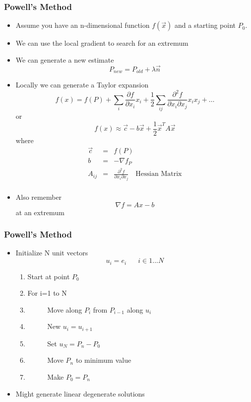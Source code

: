 \documentclass[10pt]{beamer}
\begin{document}
\begin{frame}
  \frametitle{Powell's Method}
  \begin{itemize}
  \item Assume you have an n-dimensional function $f(\vec{x})$ and a starting point $P_0$. 
  \item We can use the local gradient to search for an extremum
  \item We can generate a new estimate
    \[
      P_{new} = P_{old} + \lambda \vec{n}
    \]
  \item Locally we can generate a Taylor expansion
    \[
      f(x) = f(P) + \sum_i \frac{\partial f}{\partial x_i} x_i + \frac{1}{2} \sum_{ij} \frac{\partial^2f}{\partial x_i \partial x_j} x_i x_j + \ldots
    \] or 
    \[
      f(x) \approx \vec{c} - b \vec{x} + \frac{1}{2} \vec{x}^T A \vec{x}
    \] where
    \[
      \begin{array}{ccc}
        \vec{c} &= & f(P)\\
        b & = & - \nabla f_P \\
        A_{ij} & = & \frac{\partial^2 f}{\partial x_i \partial x_j} \mbox{~~ Hessian Matrix} \\
      \end{array}
    \] 
  \item Also remember
    \[ \nabla f = A x - b \]
    at an extremum
  \end{itemize}
\end{frame}

\begin{frame}
  \frametitle{Powell's Method}
  \begin{itemize}
  \item Initialize N unit vectors
    \[
      u_i = e_i \mbox{ ~~~ } i\in 1 ... N
    \]
    \begin{enumerate}
    \item Start at point $P_0$
    \item For i=1 to N
    \item \mbox{ ~~~ } Move along $P_i$ from $P_{i-1}$ along $u_i$
    \item \mbox{ ~~~ } New $u_i = u_{i+1}$
    \item \mbox{ ~~~ } Set $u_N = P_n - P_0$
    \item \mbox{ ~~~ } Move $P_n$ to minimum value 
    \item \mbox{ ~~~ } Make $P_0 = P_n$
    \end{enumerate}
  \item Might generate linear degenerate solutions
  \end{itemize}
\end{frame}
\end{document}
